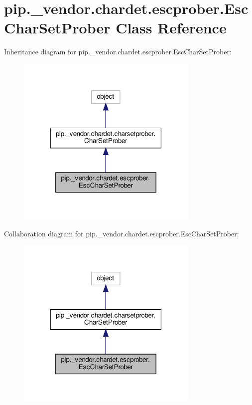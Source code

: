 \hypertarget{classpip_1_1__vendor_1_1chardet_1_1escprober_1_1EscCharSetProber}{}\section{pip.\+\_\+vendor.\+chardet.\+escprober.\+Esc\+Char\+Set\+Prober Class Reference}
\label{classpip_1_1__vendor_1_1chardet_1_1escprober_1_1EscCharSetProber}


Inheritance diagram for pip.\+\_\+vendor.\+chardet.\+escprober.\+Esc\+Char\+Set\+Prober\+:
\nopagebreak
\begin{figure}[H]
\begin{center}
\leavevmode
\includegraphics[width=247pt]{classpip_1_1__vendor_1_1chardet_1_1escprober_1_1EscCharSetProber__inherit__graph}
\end{center}
\end{figure}


Collaboration diagram for pip.\+\_\+vendor.\+chardet.\+escprober.\+Esc\+Char\+Set\+Prober\+:
\nopagebreak
\begin{figure}[H]
\begin{center}
\leavevmode
\includegraphics[width=247pt]{classpip_1_1__vendor_1_1chardet_1_1escprober_1_1EscCharSetProber__coll__graph}
\end{center}
\end{figure}
